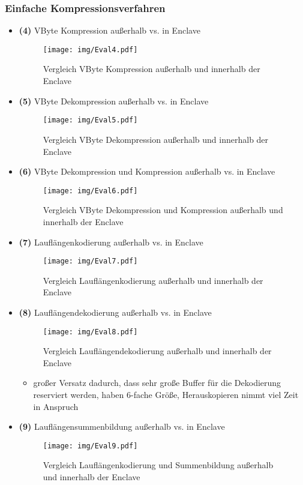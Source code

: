 \subsubsection{Einfache Kompressionsverfahren}
\begin{itemize}
	\item \textbf{(4)} VByte Kompression außerhalb vs. in Enclave
	\begin{figure}[h]
		\texttt{[image: img/Eval4.pdf]}
		\centering
		\caption{Vergleich VByte Kompression außerhalb und innerhalb der Enclave}
		\label{fig:eval4}
	\end{figure}
	
	\item \textbf{(5)} VByte Dekompression außerhalb vs. in Enclave
	\begin{figure}[h]
		\texttt{[image: img/Eval5.pdf]}
		\centering
		\caption{Vergleich VByte Dekompression außerhalb und innerhalb der Enclave}
		\label{fig:eval5}
	\end{figure}
	
	\item \textbf{(6)} VByte Dekompression und Kompression außerhalb vs. in Enclave
	\begin{figure}[h]
		\texttt{[image: img/Eval6.pdf]}
		\centering
		\caption{Vergleich VByte Dekompression und Kompression außerhalb und innerhalb der Enclave}
		\label{fig:eval6}
	\end{figure}
	
	\item \textbf{(7)} Lauflängenkodierung außerhalb vs. in Enclave
	\begin{figure}[h]
		\texttt{[image: img/Eval7.pdf]}
		\centering
		\caption{Vergleich Lauflängenkodierung außerhalb und innerhalb der Enclave}
		\label{fig:eval7}
	\end{figure}

	\item \textbf{(8)} Lauflängendekodierung außerhalb vs. in Enclave
	\begin{figure}[h]
		\texttt{[image: img/Eval8.pdf]}
		\centering
		\caption{Vergleich Lauflängendekodierung außerhalb und innerhalb der Enclave}
		\label{fig:eval8}
	\end{figure}

	\begin{itemize}
		\item großer Versatz dadurch, dass sehr große Buffer für die Dekodierung reserviert werden, haben 6-fache Größe, Herauskopieren nimmt viel Zeit in Anspruch
	\end{itemize}

	\item \textbf{(9)} Lauflängensummenbildung außerhalb vs. in Enclave
	\begin{figure}[h]
		\texttt{[image: img/Eval9.pdf]}
		\centering
		\caption{Vergleich Lauflängenkodierung und Summenbildung außerhalb und innerhalb der Enclave}
		\label{fig:eval9}
	\end{figure}

\end{itemize}
